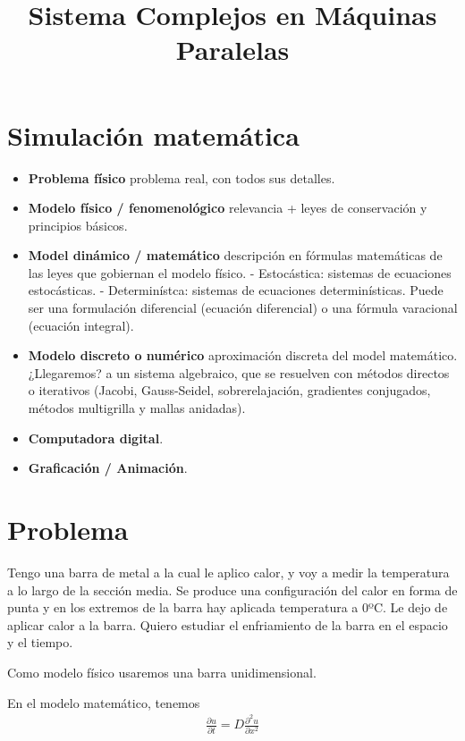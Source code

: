 \documentclass[a4paper]{article}
\title{Sistema Complejos en Máquinas Paralelas}
\begin{document}
\maketitle


\section{Simulación matemática}

\begin{itemize}
 \item \textbf{Problema físico}  problema real, con todos sus detalles.
 \item \textbf{Modelo físico / fenomenológico}  relevancia + leyes de conservación y
   principios básicos.
 \item \textbf{Model dinámico / matemático}  descripción en fórmulas matemáticas de las
   leyes que gobiernan el modelo físico.
   - Estocástica: sistemas de ecuaciones estocásticas.
   - Determinístca: sistemas de ecuaciones determinísticas. Puede ser una formulación
     diferencial (ecuación diferencial) o una fórmula varacional (ecuación integral).
 \item \textbf{Modelo discreto o numérico}  aproximación discreta del model matemático.
   ¿Llegaremos? a un sistema algebraico, que se resuelven con métodos directos
   o iterativos (Jacobi, Gauss-Seidel, sobrerelajación, gradientes conjugados,
   métodos multigrilla y mallas anidadas).
 \item \textbf{Computadora digital}.
 \item \textbf{Graficación / Animación}.
\end{itemize}


\section{Problema}

Tengo una barra de metal a la cual le aplico calor, y voy a medir la temperatura
a lo largo de la sección media. Se produce una configuración del calor en forma
de punta y en los extremos de la barra hay aplicada temperatura a 0ºC. Le dejo
de aplicar calor a la barra. Quiero estudiar el enfriamiento de la barra en el
espacio y el tiempo.

Como modelo físico usaremos una barra unidimensional.

En el modelo matemático, tenemos
\begin{align}
\frac{\partial u}{\partial t} = D\frac{\partial^2 u}{\partial x^2}
\end{align}
\end{document}
